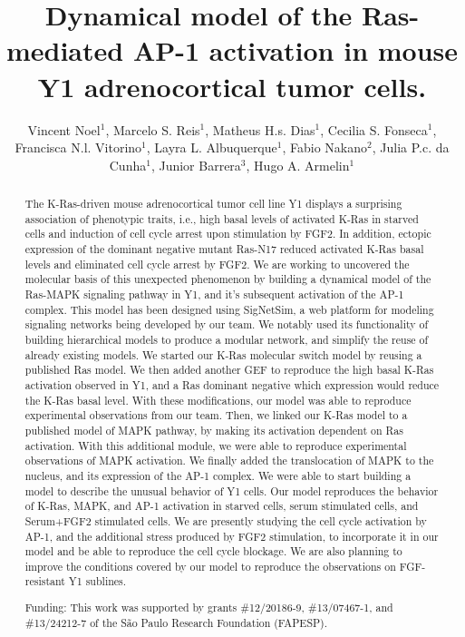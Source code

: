 \documentclass[twoside]{article}
\title{\vspace{-15mm}\fontsize{24pt}{10pt}\selectfont\textbf{Dynamical model of the Ras-mediated AP-1 activation in mouse Y1 adrenocortical tumor cells.}} %
\author{Vincent Noel$^1$, Marcelo S. Reis$^1$, Matheus H.s. Dias$^1$, Cecilia S. Fonseca$^1$, Francisca N.l. Vitorino$^1$, Layra L. Albuquerque$^1$, Fabio Nakano$^2$, Julia P.c. da Cunha$^1$, Junior Barrera$^3$, Hugo A. Armelin$^1$}
\affil{1 INSTITUTO BUTANTAN\\ 2 ESCOLA DE ARTES, CI\^ENCIAS E HUMANIDADES, USP, BRASIL\\ 3 INSTITUTO DE MATEM\'ATICA E ESTAT\'ISTICA, USP\\ }
\date{}
\begin{document}
\maketitle %

\thispagestyle{fancy} %


\begin{abstract}
The K-Ras-driven mouse adrenocortical tumor cell line Y1 displays a surprising association of phenotypic traits, i.e., high basal levels of activated K-Ras in starved cells and induction of cell cycle arrest upon stimulation by FGF2. In addition, ectopic expression of the dominant negative mutant Ras-N17 reduced activated K-Ras basal levels and eliminated cell cycle arrest by FGF2. We are working to uncovered the molecular basis of this unexpected phenomenon by building a dynamical model of the Ras-MAPK signaling pathway in Y1, and it's subsequent activation of the AP-1 complex. This model has been designed using SigNetSim, a web platform for modeling signaling networks being developed by our team. We notably used its functionality of building hierarchical models to produce a modular network, and simplify the reuse of already existing models. We started our K-Ras molecular switch model by reusing a published Ras model. We then added another GEF to reproduce the high basal K-Ras activation observed in Y1, and a Ras dominant negative which expression would reduce the K-Ras basal level. With these modifications, our model was able to reproduce experimental observations from our team. Then, we linked our K-Ras model to a published model of MAPK pathway, by making its activation dependent on Ras activation. With this additional module, we were able to reproduce experimental observations of MAPK activation. We finally added the translocation of MAPK to the nucleus, and its expression of the AP-1 complex. We were able to start building a model to describe the unusual behavior of Y1 cells. Our model reproduces the behavior of K-Ras, MAPK, and AP-1 activation in starved cells, serum stimulated cells, and Serum+FGF2 stimulated cells. We are presently studying the cell cycle activation by AP-1, and the additional stress produced by FGF2 stimulation, to incorporate it in our model and be able to reproduce the cell cycle blockage. We are also planning to improve  the conditions covered by our model to reproduce the observations on FGF-resistant Y1 sublines.

Funding: This work was supported by grants \#12/20186-9, \#13/07467-1, and \#13/24212-7 of the S\~ao Paulo Research Foundation (FAPESP).
\end{abstract}
\end{document}
